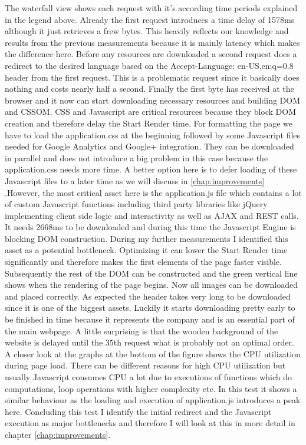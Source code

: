 The waterfall view shows each request with it's according time periods explained in the legend above. Already the first request introduces a time delay of 1578ms although it just retrieves a frew bytes. This heavily reflects our knowledge and results from the previous measurements because it is mainly latency which makes the difference here. Before any resources are downloaded a second request does a redirect to the desired language based on the Accept-Language: en-US,en;q=0.8 header from the first request. This is a problematic request since it basically does nothing and costs nearly half a second. Finally the first byte has received at the browser and it now can start downloading necessary resources and building DOM and CSSOM. CSS and Javascript are critical resources because they block DOM creation and therefore delay the Start Render time. For formatting the page we have to load the application.css at the beginning followed by some Javascript files needed for Google Analytics and Google+ integration. They can be downloaded in parallel and does not introduce a big problem in this case because the application.css needs more time. A better option here is to defer loading of these Javascript files to a later time as we will discuss in \ref{chap:improvements} .However, the most critical asset here is the application.js file which contains a lot of custom Javascript functions including third party libraries like jQuery implementing client side logic and interactivity as well as AJAX and REST calls. It needs 2668ms to be downloaded and during this time the Javascript Engine is blocking DOM construction. During my further measurements I identified this asset as a potential bottleneck. Optimizing it can lower the Start Render time significantly and therefore makes the first elements of the page faster visible. Subsequently the rest of the DOM can be constructed and the green vertical line shows when the rendering of the page begins. Now all images can be downloaded and placed correctly. As expected the header takes very long to be downloaded since it is one of the biggest assets. Luckily it starts downloading pretty early to be finished in time because it represents the company and is an essential part of the main webpage. A little surprising is that the wooden background of the website is delayed until the 35th request what is probably not an optimal order. A closer look at the graphs at the bottom of the figure shows the CPU utilization during page load. There can be different reasons for high CPU utilization but usually Javascript consumes CPU a lot due to executions of functions which do computations, loop operations with higher complexity etc. In this test it shows a similar behaviour as the loading and execution of application.js introduces a peak here. Concluding this test I identify the initial redirect and the Javascript execution as major bottlenecks and therefore I will look at this in more detail in chapter \ref{chap:improvements}. 

